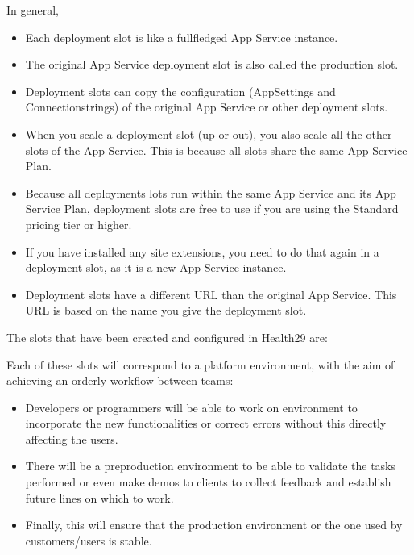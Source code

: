 \documentclass[letterpaper,10pt,english]{sphinxmanual}
\begin{document}
In general,
\begin{itemize}
\item {} 
Each deployment slot is like a full\sphinxhyphen{}fledged App Service instance.

\item {} 
The original App Service deployment slot is also called the production slot.

\item {} 
Deployment slots can copy the configuration (AppSettings and Connectionstrings) of the original App Service or other deployment slots.

\item {} 
When you scale a deployment slot (up or out), you also scale all the other slots of the App Service. This is because all slots share the same App Service Plan.

\item {} 
Because all deployments lots run within the same App Service and its App Service Plan, deployment slots are free to use if you are using the Standard pricing tier or higher.

\item {} 
If you have installed any site extensions, you need to do that again in a deployment slot, as it is a new App Service instance.

\item {} 
Deployment slots have a different URL than the original App Service. This URL is based on the name you give the deployment slot.

\end{itemize}

The slots that have been created and configured in Health29 are:



Each of these slots will correspond to a platform environment, with the aim of achieving an orderly workflow between teams:
\begin{itemize}
\item {} 
Developers or programmers will be able to work on environment to incorporate the new functionalities or correct errors without this directly affecting the users.

\item {} 
There will be a pre\sphinxhyphen{}production environment to be able to validate the tasks performed or even make demos to clients to collect feedback and establish future lines on which to work.

\item {} 
Finally, this will ensure that the production environment or the one used by customers/users is stable.

\end{itemize}
\end{document}
